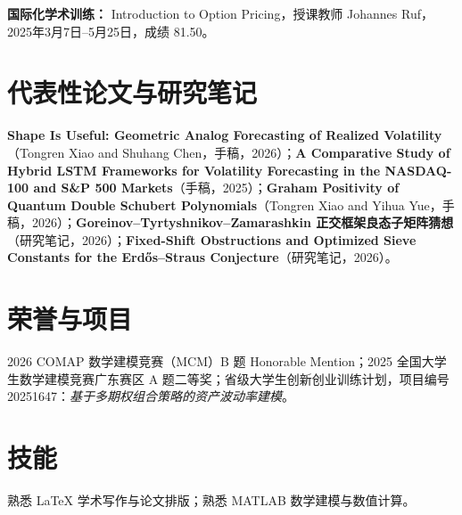 \documentclass[a4paper]{ctexart}
\begin{document}
\textbf{国际化学术训练：} Introduction to Option Pricing，授课教师 Johannes Ruf，2025年3月7日--5月25日，成绩 81.50。

\section*{代表性论文与研究笔记}
\textbf{Shape Is Useful: Geometric Analog Forecasting of Realized Volatility}（Tongren Xiao and Shuhang Chen，手稿，2026）；\textbf{A Comparative Study of Hybrid LSTM Frameworks for Volatility Forecasting in the NASDAQ-100 and S\&P 500 Markets}（手稿，2025）；\textbf{Graham Positivity of Quantum Double Schubert Polynomials}（Tongren Xiao and Yihua Yue，手稿，2026）；\textbf{Goreinov--Tyrtyshnikov--Zamarashkin 正交框架良态子矩阵猜想}（研究笔记，2026）；\textbf{Fixed-Shift Obstructions and Optimized Sieve Constants for the Erdős--Straus Conjecture}（研究笔记，2026）。

\section*{荣誉与项目}
2026 COMAP 数学建模竞赛（MCM）B 题 Honorable Mention；2025 全国大学生数学建模竞赛广东赛区 A 题二等奖；省级大学生创新创业训练计划，项目编号 20251647：\textit{基于多期权组合策略的资产波动率建模}。

\section*{技能}
熟悉 LaTeX 学术写作与论文排版；熟悉 MATLAB 数学建模与数值计算。
\end{document}
